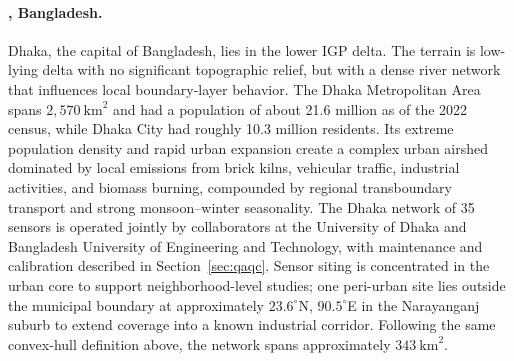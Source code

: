 \documentclass[12pt]{article}
\theoremstyle{remark}
\newcommand{\city}[1]{\capitalisewords{\MakeLowercase{#1}}}
\newcommand{\nDhaka}{35}
\begin{document}


\paragraph{\city{Dhaka}, Bangladesh.} Dhaka, the capital of Bangladesh, lies in the lower IGP delta. The terrain is low-lying delta with no significant topographic relief, but with a dense river network that influences local boundary-layer behavior. The Dhaka Metropolitan Area spans $2{,}570~\mathrm{km}^2$ and had a population of about 21.6 million as of the 2022 census, while Dhaka City had roughly 10.3 million residents.\supercite{noauthor_population_2022} Its extreme population density and rapid urban expansion create a complex urban airshed dominated by local emissions from brick kilns, vehicular traffic, industrial activities, and biomass burning, compounded by regional transboundary transport and strong monsoon--winter seasonality.\supercite{zaman_comparison_2025} The Dhaka network of {\nDhaka} sensors is operated jointly by collaborators at the University of Dhaka and Bangladesh University of Engineering and Technology, with maintenance and calibration described in Section~\ref{sec:qaqc}. Sensor siting is concentrated in the urban core to support neighborhood-level studies; one peri-urban site lies outside the municipal boundary at approximately $23.6^\circ$N, $90.5^\circ$E in the Narayanganj suburb to extend coverage into a known industrial corridor. Following the same convex-hull definition above, the network spans approximately $343~\mathrm{km}^2$.
\end{document}
